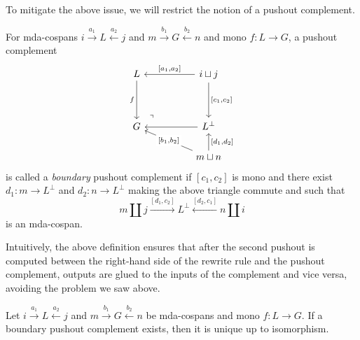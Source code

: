 To mitigate the above issue, we will restrict the notion of a pushout complement.
\begin{definition}\label{def:boundary_pushout_complement}
For mda-cospans $i \xrightarrow{a_1} L \xleftarrow{a_2} j$ and $m \xrightarrow{b_1} G \xleftarrow{b_2} n$ and mono $f : L \to G$, a pushout complement
\[\begin{tikzcd}
	L && {i \coprod j} \\
	\\
	G && {L^{\bot}} \\
	&& {m \coprod n}
	\arrow["f"', from=1-1, to=3-1]
	\arrow["{[a_1,a_2]}"', from=1-3, to=1-1]
	\arrow["{[c_1,c_2]}", from=1-3, to=3-3]
	\arrow["\lrcorner"{anchor=center, pos=0.125, rotate=90}, draw=none, from=3-1, to=1-3]
	\arrow[from=3-3, to=3-1]
	\arrow["{[b_1,b_2]}"{description}, from=4-3, to=3-1]
	\arrow["{[d_1,d_2]}"', from=4-3, to=3-3]
\end{tikzcd}\]
is called a \emph{boundary} pushout complement if $[c_1,c_2]$ is mono and there exist $d_1 : m \to L^{\bot}$ and $d_2 : n \to L^{\bot}$ making the above triangle commute and such that
\[
m \coprod j \xrightarrow{[d_1, c_2]} L^{\bot} \xleftarrow{[d_2, c_1]} n \coprod i
\] 
is an mda-cospan.
\end{definition}
Intuitively, the above definition ensures that after the second pushout is computed between the right-hand side of the rewrite rule and the pushout complement, outputs are glued to the inputs of the complement and vice versa, avoiding the problem we saw above.

\begin{proposition}
\label{prop:boundary_pushout_complement_unique}
  Let $i \xrightarrow{a_1} L \xleftarrow{a_2} j$ and $m \xrightarrow{b_1} G \xleftarrow{b_2} n$ be mda-cospans and mono $f : L \to G$.
  If a boundary pushout complement exists, then it is unique up to isomorphism.
\end{proposition}

